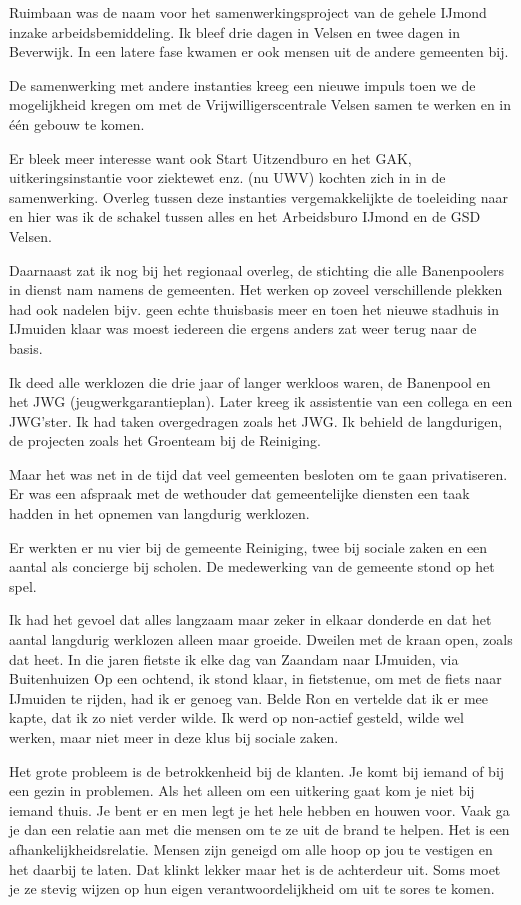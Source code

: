 \documentclass[10pt,twoside,openright]{memoir}
\begin{document}
Ruimbaan was de naam voor het samenwerkingsproject van de gehele IJmond inzake arbeidsbemiddeling. Ik bleef drie dagen in Velsen en twee dagen in Beverwijk. In een latere fase kwamen er ook mensen uit de andere gemeenten bij. 

De samenwerking met andere instanties kreeg een nieuwe impuls toen we de mogelijkheid kregen om met de Vrijwilligerscentrale Velsen samen te werken en in één gebouw te komen. 

Er bleek meer interesse want ook Start Uitzendburo en het GAK, uitkeringsinstantie voor ziektewet enz. (nu UWV) kochten zich in in de samenwerking. Overleg tussen deze instanties vergemakkelijkte de toeleiding naar en hier was ik de schakel tussen alles en het Arbeidsburo IJmond en de GSD Velsen. 

Daarnaast zat ik nog bij het regionaal overleg, de stichting die alle Banenpoolers in dienst nam namens de gemeenten. Het werken op zoveel verschillende plekken had ook nadelen bijv. geen echte thuisbasis meer en toen het nieuwe stadhuis in IJmuiden klaar was moest iedereen die ergens anders zat weer terug naar de basis. 

Ik deed alle werklozen die drie jaar of langer werkloos waren, de Banenpool en het JWG (jeugwerkgarantieplan). Later kreeg ik assistentie van een collega en een JWG’ster. Ik had taken overgedragen zoals het JWG. Ik behield de langdurigen, de projecten zoals het Groenteam bij de Reiniging. 

Maar het was net in de tijd dat veel gemeenten besloten om te gaan privatiseren. Er was een afspraak met de wethouder dat gemeentelijke diensten een taak hadden in het opnemen van langdurig werklozen. 

Er werkten er nu vier bij de gemeente Reiniging, twee bij sociale zaken en een aantal als concierge bij scholen. De medewerking van de gemeente stond op het spel. 

Ik had het gevoel dat alles langzaam maar zeker in elkaar donderde en dat het aantal langdurig werklozen alleen maar groeide. Dweilen met de kraan open, zoals dat heet. In die jaren fietste ik elke dag van Zaandam naar IJmuiden, via Buitenhuizen Op een ochtend, ik stond klaar, in fietstenue, om met de fiets naar IJmuiden te rijden, had ik er genoeg van. Belde Ron en vertelde dat ik er mee kapte, dat ik zo niet verder wilde. Ik werd op non-actief gesteld, wilde wel werken, maar niet meer in deze klus bij sociale zaken.

Het grote probleem is de betrokkenheid bij de klanten. Je komt bij iemand of bij een gezin in problemen. Als het alleen om een uitkering gaat kom je niet bij iemand thuis. Je bent er en men legt je het hele hebben en houwen voor. Vaak ga je dan een relatie aan met die mensen om te ze uit de brand te helpen. Het is een afhankelijkheidsrelatie. Mensen zijn geneigd om alle hoop op jou te vestigen en het daarbij te laten. Dat klinkt lekker maar het is de achterdeur uit. Soms moet je ze stevig wijzen op hun eigen verantwoordelijkheid om uit te sores te komen. 
\end{document}
